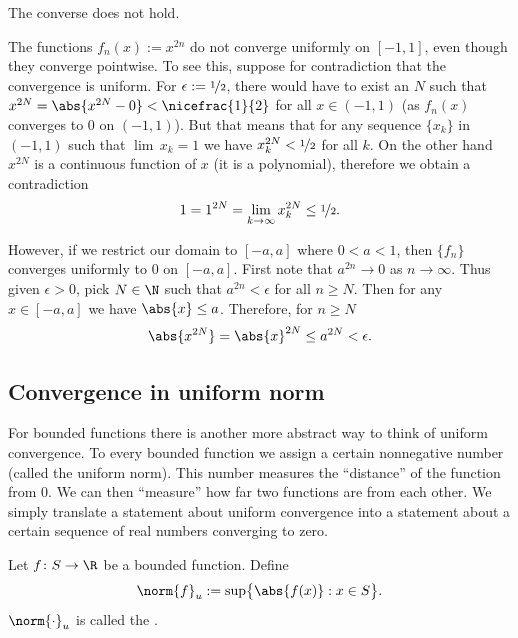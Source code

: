 \documentclass[12pt]{book}
\begin{document}
The converse does not hold.

\begin{example}
The functions $f_n(x) := x^{2n}$ do not converge uniformly on $[-1,1]$,
even though they converge pointwise.
To see this, suppose for contradiction
that the convergence is uniform.
For $\epsilon := \nicefrac{1}{2}$, there would have
to exist an $N$ such that $x^{2N} = \abs{x^{2N} - 0} < \nicefrac{1}{2}$ for all $x \in
(-1,1)$ (as $f_n(x)$ converges to 0 on $(-1,1)$).
But that means that
for any sequence $\{ x_k \}$ in $(-1,1)$ such that $\lim\, x_k = 1$
we have $x_k^{2N} < \nicefrac{1}{2}$ for all $k$.
On the other hand
$x^{2N}$ is a continuous function of $x$ (it is a polynomial), therefore
we obtain a contradiction
\begin{equation*}
1 = 1^{2N}  = \lim_{k\to\infty} x_k^{2N} \leq \nicefrac{1}{2} .
\end{equation*}

However, if we restrict our domain to $[-a,a]$ where $0 < a < 1$, then
$\{ f_n \}$ converges uniformly to 0 on $[-a,a]$.
First note
that $a^{2n} \to 0$ as $n \to \infty$.
Thus given $\epsilon > 0$,
pick $N \in \N$ such that
$a^{2n} < \epsilon$ for all $n \geq N$.
Then for any $x \in [-a,a]$
we have $\abs{x} \leq a$.
Therefore, for $n \geq N$
\begin{equation*}
\abs{x^{2N}} = \abs{x}^{2N} \leq a^{2N} < \epsilon .
\end{equation*}
\end{example}

\subsection*{Convergence in uniform norm}

For bounded functions there is another more abstract way to 
think of uniform convergence.
To every bounded function we assign
a certain nonnegative number (called the uniform norm).
This number
measures the ``distance'' of the function from 0.
We can then ``measure''
how far two functions are from each other.
We simply translate
a statement about uniform convergence into a statement about a certain
sequence of real numbers converging to zero.

\begin{defn} \label{def:unifnorm}
Let $f \colon S \to \R$ be a bounded function.
Define
\begin{equation*}
\norm{f}_u :=
\sup \bigl\{ \abs{f(x)} : x \in S \bigr\} .
\end{equation*}
$\norm{\cdot}_u$ is called the \emph{}.
\end{defn}
\end{document}
